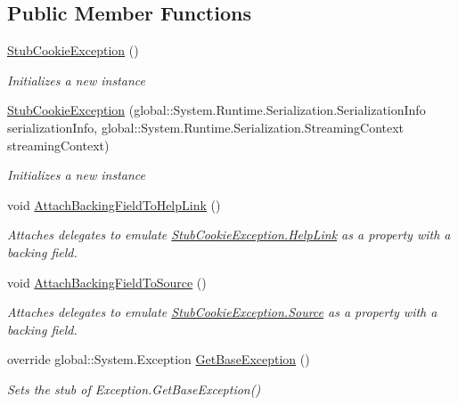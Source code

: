 \subsection*{Public Member Functions}
\begin{DoxyCompactItemize}
\item 
\hyperlink{class_system_1_1_net_1_1_fakes_1_1_stub_cookie_exception_a38b14e7b4a0f7c29db43ab9c98256f87}{Stub\-Cookie\-Exception} ()
\begin{DoxyCompactList}\small\item\em Initializes a new instance\end{DoxyCompactList}\item 
\hyperlink{class_system_1_1_net_1_1_fakes_1_1_stub_cookie_exception_ae36d00ff003d9ba00f81fd2bbfd52901}{Stub\-Cookie\-Exception} (global\-::\-System.\-Runtime.\-Serialization.\-Serialization\-Info serialization\-Info, global\-::\-System.\-Runtime.\-Serialization.\-Streaming\-Context streaming\-Context)
\begin{DoxyCompactList}\small\item\em Initializes a new instance\end{DoxyCompactList}\item 
void \hyperlink{class_system_1_1_net_1_1_fakes_1_1_stub_cookie_exception_a2f8d06632b619d64c835f7f0b81d0965}{Attach\-Backing\-Field\-To\-Help\-Link} ()
\begin{DoxyCompactList}\small\item\em Attaches delegates to emulate \hyperlink{class_system_1_1_net_1_1_fakes_1_1_stub_cookie_exception_ae2ffa18bbaf4d33b301b8fe2d1dd4d70}{Stub\-Cookie\-Exception.\-Help\-Link} as a property with a backing field.\end{DoxyCompactList}\item 
void \hyperlink{class_system_1_1_net_1_1_fakes_1_1_stub_cookie_exception_ae0afaa084931897ade5f3405d86c3008}{Attach\-Backing\-Field\-To\-Source} ()
\begin{DoxyCompactList}\small\item\em Attaches delegates to emulate \hyperlink{class_system_1_1_net_1_1_fakes_1_1_stub_cookie_exception_a2249e9a36541a49662befb96f94dc097}{Stub\-Cookie\-Exception.\-Source} as a property with a backing field.\end{DoxyCompactList}\item 
override global\-::\-System.\-Exception \hyperlink{class_system_1_1_net_1_1_fakes_1_1_stub_cookie_exception_ab3d064b81b272df7256a6810b5bd5180}{Get\-Base\-Exception} ()
\begin{DoxyCompactList}\small\item\em Sets the stub of Exception.\-Get\-Base\-Exception()\end{DoxyCompactList}\item 

\end{DoxyCompactItemize}
